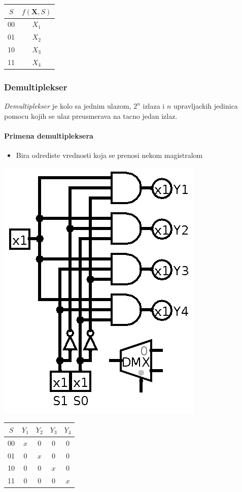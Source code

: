 \documentclass[12p,a4paper]{article}
\begin{document}
\begin{multicols}{2}
    \begin{tabular}{*{2}{c}}
        $S$ & $f(\mathbf{X}, S)$ \\
        \midrule
        00  & $X_1$ \\
        01  & $X_2$ \\
        10  & $X_3$ \\
        11  & $X_4$ \\
    \end{tabular}

    \subsubsection{Demultiplekser}

    \emph{Demultiplekser} je kolo sa jednim ulazom, $2^n$ izlaza i $n$
    upravljackih jedinica pomocu kojih se ulaz preusmerava na tacno jedan
    izlaz.

    \paragraph{Primena demultipleksera}
    \begin{itemize}
        \itemsep0em
        \item Bira odrediste vrednosti koja se prenosi nekom magistralom
    \end{itemize}
    \includegraphics[width=0.6\columnwidth]{Figures/dmx.png}

    \begin{tabular}{*{5}{c}}
        $S$ & $Y_1$ & $Y_2$ & $Y_3$ & $Y_4$ \\
        \midrule
        00  & $x$ &  0  &  0  &  0  \\
        01  &  0  & $x$ &  0  &  0  \\
        10  &  0  &  0  & $x$ &  0  \\
        11  &  0  &  0  &  0  & $x$ \\
    \end{tabular}


\end{multicols}
\end{document}
